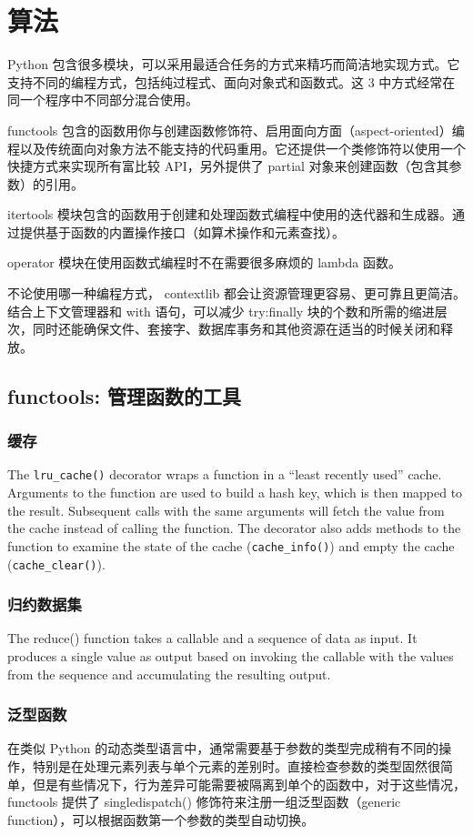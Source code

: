 \chapter{算法}
Python 包含很多模块，可以采用最适合任务的方式来精巧而简洁地实现方式。它支持不同的编程方式，包括纯过程式、面向对象式和函数式。这 3 中方式经常在同一个程序中不同部分混合使用。

functools 包含的函数用你与创建函数修饰符、启用面向方面（aspect-oriented）编程以及传统面向对象方法不能支持的代码重用。它还提供一个类修饰符以使用一个快捷方式来实现所有富比较 API，另外提供了 partial 对象来创建函数（包含其参数）的引用。

itertools 模块包含的函数用于创建和处理函数式编程中使用的迭代器和生成器。通过提供基于函数的内置操作接口（如算术操作和元素查找）。

operator 模块在使用函数式编程时不在需要很多麻烦的 lambda 函数。

不论使用哪一种编程方式， contextlib 都会让资源管理更容易、更可靠且更简洁。结合上下文管理器和 with 语句，可以减少 try:finally 块的个数和所需的缩进层次，同时还能确保文件、套接字、数据库事务和其他资源在适当的时候关闭和释放。
\section{functools: 管理函数的工具}
\subsection{缓存}
The \verb|lru_cache()| decorator wraps a function in a “least recently used” cache. Arguments to the function are used to build a hash key, which is then mapped to the result. Subsequent calls with the same arguments will fetch the value from the cache instead of calling the function. The decorator also adds methods to the function to examine the state of the cache (\verb|cache_info()|) and empty the cache (\verb|cache_clear()|).
\subsection{归约数据集}
The reduce() function takes a callable and a sequence of data as input. It produces a single value as output based on invoking the callable with the values from the sequence and accumulating the resulting output.

\subsection{泛型函数}
在类似 Python 的动态类型语言中，通常需要基于参数的类型完成稍有不同的操作，特别是在处理元素列表与单个元素的差别时。直接检查参数的类型固然很简单，但是有些情况下，行为差异可能需要被隔离到单个的函数中，对于这些情况，functools 提供了 singledispatch() 修饰符来注册一组泛型函数（generic function），可以根据函数第一个参数的类型自动切换。



